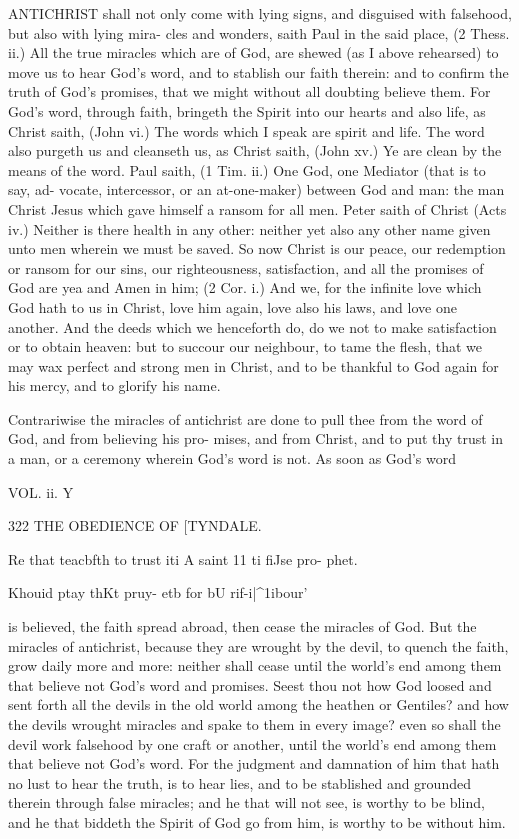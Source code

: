 \documentclass{custom}
\begin{document}
{ANTICHRIST shall not only come with lying signs,
and disguised with falsehood, but also with lying mira-
cles and wonders, saith Paul in the said place, (2 Thess. 
ii.) All the true miracles which are of God, are shewed (as 
I above rehearsed) to move us to hear God's word, and to 
stablish our faith therein: and to confirm the truth of 
God's promises, that we might without all doubting believe 
them. For God's word, through faith, bringeth the Spirit 
into our hearts and also life, as Christ saith, (John vi.) 
The words which I speak are spirit and life. The word 
also purgeth us and cleanseth us, as Christ saith, (John 
xv.) Ye are clean by the means of the word. Paul saith, 
(1 Tim. ii.) One God, one Mediator (that is to say, ad- 
vocate, intercessor, or an at-one-maker) between God and 
man: the man Christ Jesus which gave himself a ransom 
for all men. Peter saith of Christ (Acts iv.) Neither is there 
health in any other: neither yet also any other name 
given unto men wherein we must be saved. So now 
Christ is our peace, our redemption or ransom for our sins, 
our righteousness, satisfaction, and all the promises of God 
are yea and Amen in him; (2 Cor. i.) And we, for the 
infinite love which God hath to us in Christ, love him 
again, love also his laws, and love one another. And the
deeds which we henceforth do, do we not to make satisfaction
or to obtain heaven: but to succour our neighbour, to
tame the flesh, that we may wax perfect and strong men 
in Christ, and to be thankful to God again for his mercy, 
and to glorify his name. 

Contrariwise the miracles of antichrist are done to
pull thee from the word of God, and from believing his pro-
mises, and from Christ, and to put thy trust in a man, or a
ceremony wherein God's word is not. As soon as God's word 

VOL. ii. Y 


322
THE OBEDIENCE OF
[TYNDALE.

Re that 
teacbfth to 
trust iti A 
saint 11 ti 
fiJse pro- 
phet. 

Khouid ptay 
thKt pruy- 
etb for bU 
rif-i|^1ibour' 

is believed, the faith spread abroad, then cease the miracles 
of God. But the miracles of antichrist, because they are 
wrought by the devil, to quench the faith, grow daily more 
and more: neither shall cease until the world's end among 
them that believe not God's word and promises. Seest 
thou not how God loosed and sent forth all the devils in 
the old world among the heathen or Gentiles? and how 
the devils wrought miracles and spake to them in every 
image? even so shall the devil work falsehood by one craft 
or another, until the world's end among them that believe 
not God's word. For the judgment and damnation of him 
that hath no lust to hear the truth, is to hear lies, and to 
be stablished and grounded therein through false miracles; 
and he that will not see, is worthy to be blind, and he that
biddeth the Spirit of God go from him, is worthy to be 
without him. 

}
\end{document}
